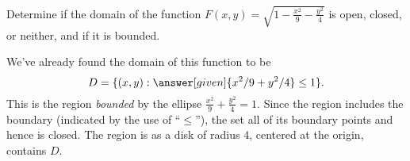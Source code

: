 \documentclass{ximera}
\begin{document}


\begin{example}
  Determine if the domain of the function
  $F(x,y)=\sqrt{1-\frac{x^2}9-\frac{y^2}4}$ is open, closed, or
  neither, and if it is bounded.
  \begin{explanation}
    We've already found the domain of this function to be
    \[
    D = \{(x,y): \answer[given]{x^2/9+y^2/4}\leq 1\}.
    \]
    This is the region \textit{bounded} by the ellipse
    $\frac{x^2}9+\frac{y^2}4=1$. Since the region includes the
    boundary (indicated by the use of ``$\leq$''), the set
    all of its boundary points and hence is closed. The region is
     as a disk
    of radius $4$, centered at the origin, contains $D$.
  \end{explanation}
\end{example}
\end{document}
